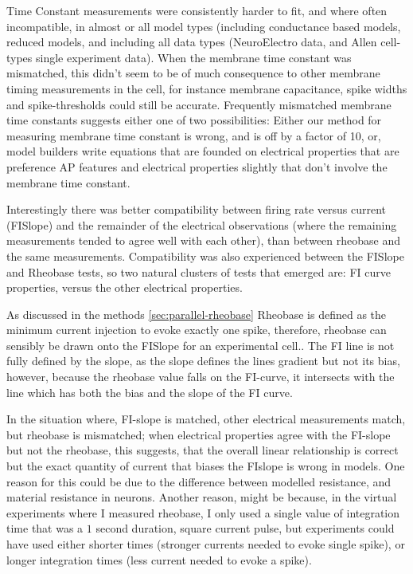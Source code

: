 Time Constant measurements were consistently harder to fit, and where often incompatible, in almost or all model types (including conductance based models, reduced models, and including all data types (NeuroElectro data, and Allen cell-types single experiment data). When the membrane time constant was mismatched, this didn't seem to be of much consequence to other membrane timing measurements in the cell, for instance membrane capacitance, spike widths and spike-thresholds could still be accurate. Frequently mismatched membrane time constants suggests either one of two possibilities: Either our method for measuring membrane time constant is wrong, and is off by a factor of 10, or, model builders write equations that are founded on electrical properties that are preference AP features and electrical properties slightly that don't involve the membrane time constant.

Interestingly there was better compatibility between firing rate versus current (FISlope) and the remainder of the electrical observations (where the remaining measurements tended to agree well with each other), than between rheobase and the same measurements. Compatibility was also experienced between the FISlope and Rheobase tests, so two natural clusters of tests that emerged are: FI curve properties, versus the other electrical properties.

As discussed in the methods \ref{sec:parallel-rheobase} Rheobase is defined as the minimum current injection to evoke exactly one spike, therefore, rheobase can sensibly be drawn onto the FISlope for an experimental cell.. The FI line is not fully defined by the slope, as the slope defines the lines gradient but not its bias, however, because the rheobase value falls on the FI-curve, it intersects with the line which has both the bias and the slope of the FI curve. 

In the situation where, FI-slope is matched, other electrical measurements match, but rheobase is mismatched; when electrical properties agree with the FI-slope but not the rheobase, this suggests, that the overall linear relationship is correct but the exact quantity of current that biases the FIslope is wrong in models. One reason for this could be due to the difference between modelled resistance, and material resistance in neurons. Another reason, might be because, in the virtual experiments where I measured rheobase, I only used a single value of integration time that was a $1$ second duration,  square current pulse, but experiments could have used either shorter times (stronger currents needed to evoke single spike), or longer integration times (less current needed to evoke a spike).